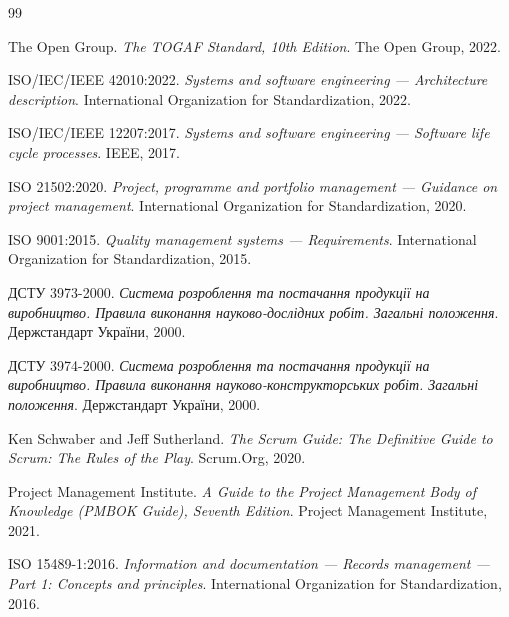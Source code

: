 \documentclass{article}
\begin{document}
\begin{thebibliography}{99}

 The Open Group.
\newblock \emph{The TOGAF Standard, 10th Edition}.
\newblock The Open Group, 2022.

 ISO/IEC/IEEE 42010:2022.
\newblock \emph{Systems and software engineering --- Architecture description}.
\newblock International Organization for Standardization, 2022.

 ISO/IEC/IEEE 12207:2017.
\newblock \emph{Systems and software engineering --- Software life cycle processes}.
\newblock IEEE, 2017.

 ISO 21502:2020.
\newblock \emph{Project, programme and portfolio management --- Guidance on project management}.
\newblock International Organization for Standardization, 2020.

 ISO 9001:2015.
\newblock \emph{Quality management systems --- Requirements}.
\newblock International Organization for Standardization, 2015.

 ДСТУ 3973-2000.
\newblock \emph{Система розроблення та постачання продукції на виробництво. Правила виконання науково-дослідних робіт. Загальні положення}.
\newblock Держстандарт України, 2000.

 ДСТУ 3974-2000.
\newblock \emph{Система розроблення та постачання продукції на виробництво. Правила виконання науково-конструкторських робіт. Загальні положення}.
\newblock Держстандарт України, 2000.

 Ken Schwaber and Jeff Sutherland.
\newblock \emph{The Scrum Guide: The Definitive Guide to Scrum: The Rules of the Play}.
\newblock Scrum.Org, 2020.

 Project Management Institute.
\newblock \emph{A Guide to the Project Management Body of Knowledge (PMBOK Guide), Seventh Edition}.
\newblock Project Management Institute, 2021.

 ISO 15489-1:2016.
\newblock \emph{Information and documentation --- Records management --- Part 1: Concepts and principles}.
\newblock International Organization for Standardization, 2016.

\end{thebibliography}
\end{document}
